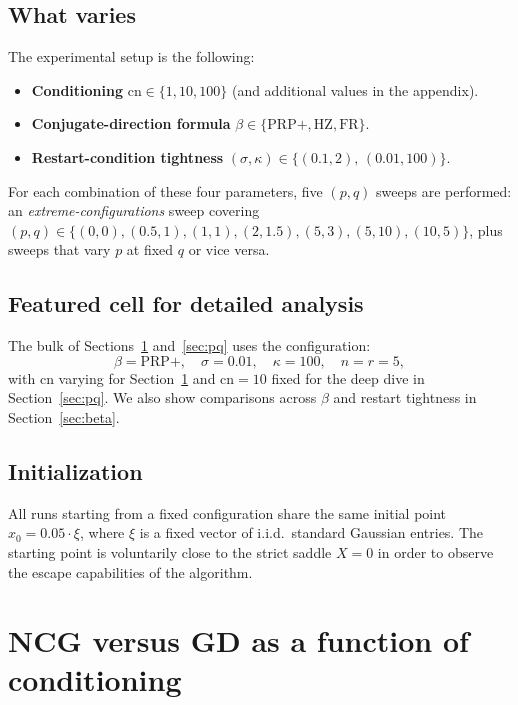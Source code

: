 \documentclass[11pt,a4paper]{article}
\theoremstyle{plain}
\theoremstyle{definition}
\begin{document}
\subsection{What varies}\label{subsec:axes}

The experimental setup is the following:
\begin{itemize}[leftmargin=2em]
  \item \textbf{Conditioning} $\mathrm{cn} \in \{1, 10, 100\}$ (and additional values in the appendix).
  \item \textbf{Conjugate-direction formula} $\beta \in \{\text{PRP+}, \text{HZ}, \text{FR}\}$.
  \item \textbf{Restart-condition tightness} $(\sigma, \kappa) \in \{(0.1, 2),\, (0.01, 100)\}$.
\end{itemize}
For each combination of these four parameters, five $(p, q)$ sweeps 
are performed: an \emph{extreme-configurations} sweep covering 
$(p, q) \in \{(0,0), (0.5,1), (1,1), (2,1.5), (5,3), (5,10), (10,5)\}$, 
plus sweeps that vary $p$ at fixed $q$ or vice versa.

\subsection{Featured cell for detailed analysis}\label{subsec:featured}

The bulk of Sections~\ref{sec:cn} and~\ref{sec:pq} uses the configuration:
\[
  \beta = \text{PRP+}, \quad
  \sigma = 0.01, \quad
  \kappa = 100, \quad
  n = r = 5,
\]
with $\mathrm{cn}$ varying for Section~\ref{sec:cn} and $\mathrm{cn} = 10$ 
fixed for the deep dive in Section~\ref{sec:pq}. 
We also show comparisons across $\beta$ and restart tightness
in Section~\ref{sec:beta}.

\subsection{Initialization}

All runs starting from a fixed configuration share the same initial point 
$x_0 = 0.05 \cdot \xi$, where $\xi$ is a fixed vector of i.i.d.\ 
standard Gaussian entries. The starting point is voluntarily close to the strict 
saddle $X = 0$ in order to observe the escape capabilities of the algorithm.

\section{NCG versus GD as a function of conditioning}\label{sec:cn}
\end{document}
